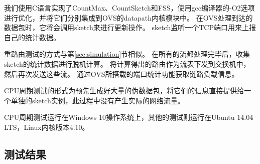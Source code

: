 我们使用C语言实现了CountMax、CountSketch和FSS，使用gcc编译器\cite{gcc}的-O2选项进行优化，并将它们分别集成到OVS的datapath内核模块中。
在OVS处理到达的数据包时，它将会调用sketch来进行更新操作。
sketch监听一个TCP端口用来上报自己的统计数据。

重路由测试的方式与第\ref{sec:simulation}节相似。
在所有的流都处理完毕后，收集sketch的统计数据进行脱机计算。
将计算得出的路由作为流表下发到交换机中，然后再次发送这些流。
通过OVS所搭载的端口统计功能获取链路负载信息。

CPU周期测试的形式为预先生成好大量的伪数据包，将它们的信息直接提供给一个单独的sketch实例，此过程中没有产生实际的网络流量。

CPU周期测试运行在Windows 10操作系统上，其他的测试则运行在Ubuntu 14.04 LTS，Linux内核版本4.10。

 
\subsection{测试结果}

